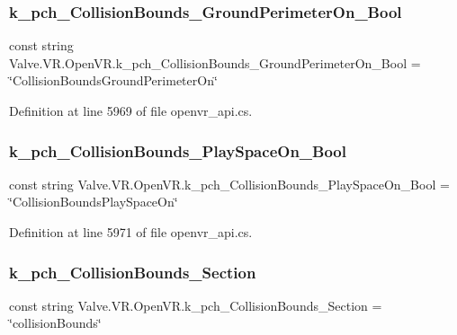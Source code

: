 \subsubsection{\texorpdfstring{k\_pch\_CollisionBounds\_GroundPerimeterOn\_Bool}{k\_pch\_CollisionBounds\_GroundPerimeterOn\_Bool}}
{\footnotesize\ttfamily const string Valve.\+V\+R.\+Open\+V\+R.\+k\+\_\+pch\+\_\+\+Collision\+Bounds\+\_\+\+Ground\+Perimeter\+On\+\_\+\+Bool = \char`\"{}Collision\+Bounds\+Ground\+Perimeter\+On\char`\"{}}



Definition at line 5969 of file openvr\+\_\+api.\+cs.

\mbox{\label{class_valve_1_1_v_r_1_1_open_v_r_afa928f44a4681f506b92eaa09085d28f}} 
\subsubsection{\texorpdfstring{k\_pch\_CollisionBounds\_PlaySpaceOn\_Bool}{k\_pch\_CollisionBounds\_PlaySpaceOn\_Bool}}
{\footnotesize\ttfamily const string Valve.\+V\+R.\+Open\+V\+R.\+k\+\_\+pch\+\_\+\+Collision\+Bounds\+\_\+\+Play\+Space\+On\+\_\+\+Bool = \char`\"{}Collision\+Bounds\+Play\+Space\+On\char`\"{}}



Definition at line 5971 of file openvr\+\_\+api.\+cs.

\mbox{\label{class_valve_1_1_v_r_1_1_open_v_r_a65a17cf92e276bf7b29f8b2fcefca6d0}} 
\subsubsection{\texorpdfstring{k\_pch\_CollisionBounds\_Section}{k\_pch\_CollisionBounds\_Section}}
{\footnotesize\ttfamily const string Valve.\+V\+R.\+Open\+V\+R.\+k\+\_\+pch\+\_\+\+Collision\+Bounds\+\_\+\+Section = \char`\"{}collision\+Bounds\char`\"{}}



